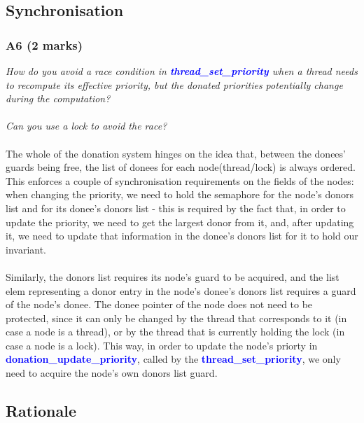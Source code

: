 \documentclass{report}
\newcommand{\question}[1]{\textit{#1} \\ }
\newcommand{\fun}[1]{\textcolor{blue}{\textbf{#1}}}
\begin{document}
            \subsection*{Synchronisation}
                \subsubsection*{A6  (2 marks)}
                    \question{How do you avoid a race condition in \fun{thread\_set\_priority} when a thread needs to recompute its effective priority, but the donated priorities potentially change during the computation?
                    \\
                    \\Can you use a lock to avoid the race?}
                    \\The whole of the donation system hinges on the idea that, between the donees' guards being free, the list of donees for each node(thread/lock) is always ordered.
                    This enforces a couple of synchronisation requirements on the fields of the nodes: when changing the priority, we need to hold the
                    semaphore for the node's donors list and for its donee's donors list - this is required by the fact that, in order to update the priority,
                    we need to get the largest donor from it, and, after updating it, we need to update that information in the donee's donors list for it to hold
                    our invariant. 
                    \\ \\ Similarly, the donors list requires its node's guard to be acquired, and the list elem representing a donor entry in the node's
                    donee's donors list requires a guard of the node's donee. The donee pointer of the node does not need to be protected, since it can only be
                    changed by the thread that corresponds to it (in case a node is a thread), or by the thread that is currently holding the lock (in case a node is a lock).
                    This way, in order to update the node's priorty in \fun{donation\_update\_priority}, called by the \fun{thread\_set\_priority},
                    we only need to acquire the node's own donors list guard.

            \subsection*{Rationale}
\end{document}
